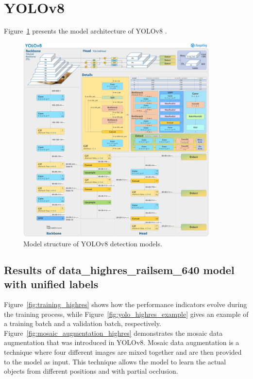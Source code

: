 \documentclass[Master,MDS,english]{BASE/twbook} %
\begin{document}
\section{YOLOv8} \label{app:yolo}

Figure~\ref{fig:yolo_architecture} presents the model architecture of YOLOv8 \citep{RangeKing}.

\begin{figure}[H]
\centering
\includegraphics[width=0.9\textwidth]{images/yolo/architecture}
\caption{Model structure of YOLOv8 detection models. }
\label{fig:yolo_architecture}
\end{figure}

\subsection{Results of data\_highres\_railsem\_640 model with unified labels}

Figure~\ref{fig:training_highres} shows how the performance indicators evolve during the training process, while Figure~\ref{fig:yolo_highres_example} gives an example of a training batch and a validation batch, respectively.
Figure~\ref{fig:mosaic_augmentation_highres} demonstrates the mosaic data augmentation that was introduced in YOLOv8. 
Mosaic data augmentation is a technique where four different images are mixed together and are then provided to the model as input. This technique allows the model to learn the actual objects from different positions and with partial occlusion. 
\end{document}
